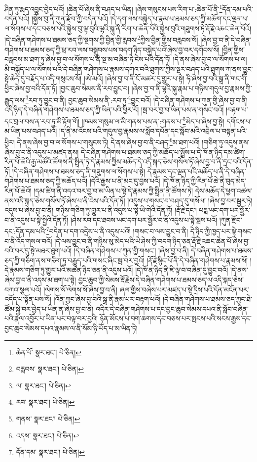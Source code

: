 ཤིན་ཏུ་རྨད་འབྱུང་བྱེད་པའོ། །ཆེན་པོ་ཞེས་ནི་བཤད་པ་ཡིན། །ཞེས་གསུངས་པས་རིག་པ་:ཆེན་པོ་ནི་\footnote{ཆེན་པོ་  སྣར་ཐང་།  པེ་ཅིན། }དོན་དམ་པའི་བདེན་པའོ། །སྐྱེས་བུ་ནི་ཀུན་རྫོབ་ཀྱི་བདེན་པའོ། །དེ་དག་ལས་བསྐྱེད་པ་རྣམ་པ་ཐམས་ཅད་ཀྱི་མཆོག་དང་ལྡན་པ་ལ་སོགས་པ་དང་བཅས་པའི་སྐྱེས་བུ་ལྟ་བུའི་ལྷའི་སྐུ་ནི་རིག་པ་ཆེན་པོའི་སྐྱེས་བུའི་གཟུགས་ཏེ་རྡོ་རྗེ་འཆང་ཆེན་པོའོ། །དེ་བཞིན་གཤེགས་པ་ཐམས་ཅད་ཀྱི་སྔགས་ཀྱི་བྱིན་གྱི་རླབས་\footnote{བརླབས་  སྣར་ཐང་།  པེ་ཅིན། }ཀྱིས་བྱིན་གྱིས་བརླབས་སོ། །ཞེས་བྱ་བ་ནི་དེ་བཞིན་གཤེགས་པ་ཐམས་ཅད་ཀྱི་ཕྲ་རབ་ལས་བསྒྲུབས་པས་བདག་ཉིད་བསྐྱེད་པའོ་ཞེས་བྱ་བར་དགོངས་སོ། །བྱིན་གྱིས་བརླབས་མ་ཐག་ཏུ་ཞེས་བྱ་བ་ལ་སོགས་པ་ནི་སྔ་མ་བཞིན་ཏེ་ངེས་པའི་དོན་ཏོ། །དེ་ནས་ཞེས་བྱ་བ་ལ་སོགས་པ་ལ། མི་བསྐྱོད་པ་ལ་སོགས་པའི་དེ་བཞིན་གཤེགས་པ་རྣམས་དགའ་བའི་ཐུགས་ཀྱིས་སྔར་བཤད་པའི་ཐུགས་ཀ་ནས་བྱུང་སྟེ་ཆེད་དུ་བརྗོད་པ་འདི་གསུངས་སོ། །ཨེ་མའོ། །ཞེས་བྱ་བ་ནི་ངོ་མཚར་དུ་གྱུར་པ་སྟེ། ཧི་ཞེས་བྱ་བའི་སྒྲ་ནི་གང་གི་ཕྱིར་ཞེས་བྱ་བའི་དོན་ཏོ། །བྱང་ཆུབ་སེམས་ནི་རབ་བྱུང་བ། །ཞེས་བྱ་བ་ནི་ལྷའི་སྐུ་རྣམ་པ་གཉིས་གདུལ་བྱ་རྣམས་ཀྱི་རྒྱུད་ལས་\footnote{ལ་  སྣར་ཐང་།  པེ་ཅིན། }རབ་ཏུ་བྱུང་བ་ནི། བྱང་ཆུབ་སེམས་ནི་:རབ་ཏུ་\footnote{རབ་  སྣར་ཐང་།  པེ་ཅིན། }བྱུང་བའོ། །དེ་བཞིན་གཤེགས་པ་ཀུན་གྱི་ཞེས་བྱ་བ་ནི། འདི་ཉིད་དེ་བཞིན་གཤེགས་པ་ཐམས་ཅད་ཀྱི་ཡིན་པའི་ཕྱིར་རོ། །སྦ་བར་བྱ་བ་ཡིན་པས་ན་གསང་བའོ། །བརྟག་པ་དང་བྲལ་བས་ན་རབ་ཏུ་མི་རྟོག་གོ། །ཁམས་གསུམ་ལ་མི་གནས་པས་ན་:གནས་པ་\footnote{གནས་  སྣར་ཐང་།  པེ་ཅིན། }མེད་པ་ཞེས་བྱ་སྟེ། དགོངས་པ་མ་ཡིན་པས་བཤད་པའོ། །ད་ནི་མ་འོངས་པའི་གདུལ་བྱ་རྣམས་ལ་སློབ་དཔོན་དང་སློབ་མའི་འབྲེལ་པ་བསྟན་པའི་ཕྱིར། དེ་ནས་ཞེས་བྱ་བ་ལ་སོགས་པ་གསུངས་ཏེ། དེ་ནས་ཞེས་བྱ་བ་ནི་བཤད་\footnote{འདས་  སྣར་ཐང་།  པེ་ཅིན། }མ་ཐག་པའོ། །གཅིག་ཏུ་འདུས་ནས་ཞེས་བྱ་བ་ནི་འདུས་པ་མཛད་ནས། དེ་བཞིན་གཤེགས་པ་ཐམས་ཅད་ཀྱི་མཆོད་པ་སྤྲོས་པ་དེ་ཁོ་ན་ཉིད་དམ་ཚིག་རིན་པོ་ཆེའི་རྒྱ་མཚོའི་ཚོགས་ནི་སྤྲིན་ཏེ་དེ་རྣམས་ཀྱིས་མཆོད་དེ་འདི་སྐད་ཅེས་གསོལ་ཏོ་ཞེས་བྱ་བ་ནི་དྲང་བའི་དོན་ཏོ། །དེ་བཞིན་གཤེགས་པ་ཐམས་ཅད་ནི་གཟུགས་ལ་སོགས་པ་སྟེ། དེ་རྣམས་དང་ལྡན་པའི་མཆོད་པ་ནི་དེ་བཞིན་གཤེགས་པ་ཐམས་ཅད་ཀྱི་མཆོད་པའོ། །དེའི་རྒྱས་པ་ནི་མང་དུ་བྱས་པའོ། །དེ་ཁོ་ན་ཉིད་ཀྱི་རིན་པོ་ཆེ་ནི་བུད་མེད་རིན་པོ་ཆེའོ། །དམ་ཚིག་ནི་འདའ་བར་བྱ་བ་མ་ཡིན་པ་སྟེ་དེ་རྣམས་ཀྱི་སྤྲིན་ནི་ཚོགས་ཏེ། དེས་མཆོད་དེ་ཕྱག་འཚལ་ནས་འདི་སྐད་ཅེས་གསོལ་ཏོ་ཞེས་པ་ནི་ངེས་པའི་དོན་ཏོ། །འདུས་པ་གསང་བ་བཤད་དུ་གསོལ། །ཞེས་བྱ་བར་སྦྱར་ཏེ། འདུས་པ་ཞེས་བྱ་བ་ནི། གཉིས་གཅིག་ཏུ་གྱུར་པ་ནི་འདུས་པ་སྟེ་ཡི་གེའི་དོན་ཏོ། །རྡོ་རྗེ་དང་། པདྨ་ཡང་དག་པར་སྦྱོར་བ་ནི་འདུས་པ་སྟེ་སྤྱིའི་དོན་ཏོ། །ཤེས་རབ་དང་ཐབས་ཡང་དག་པར་སྦྱོར་བ་ནི་འདུས་པ་སྟེ་སྦས་པའོ། །ཀུན་རྫོབ་དང་:དོན་དམ་པའི་\footnote{དོན་དམ་  སྣར་ཐང་།  པེ་ཅིན། }བདེན་པ་དག་འདྲེས་པ་ནི་འདུས་པའོ། །གསང་བ་ལས་བྱུང་བ་ནི། དེ་ཉིད་ཀྱི་ཁྱད་པར་སྟེ་གསང་བ་ནི་འོད་གསལ་བའོ། །དེ་ལས་བྱུང་བ་ནི་གཉིས་སུ་མེད་པའི་ཡེ་ཤེས་ཀྱི་བདག་ཉིད་ཅན་རྡོ་རྗེ་འཆང་ཆེན་པོ་ཞེས་བྱ་བའི་བར་དུ་སྟེ་མཐར་ཐུག་པའོ། །དེ་བཞིན་གཤེགས་པ་ཀུན་གྱི་གསང་། །ཞེས་བྱ་བ་ནི། དེ་བཞིན་གཤེགས་པ་ཐམས་ཅད་ཀྱི་གཅིག་ནས་གཅིག་ཏུ་བརྒྱུད་པའི་གསང་ཞིང་སྦ་བར་བྱའོ། །རྡོ་རྗེ་སྙིང་པོ་ནི་དེ་བཞིན་གཤེགས་པ་རྣམས་སོ། །དེ་རྣམས་གཅིག་ཏུ་གྱུར་པའི་མཚན་ཉིད་ཅན་ནི་འདུས་པའོ། །དེ་ཁོ་ན་ཉིད་ནི་ཇི་ལྟ་བ་བཞིན་དུ་བྱུང་བའོ། །དེ་ནས་ཞེས་བྱ་བ་ནི་འདས་མ་ཐག་པ་སྟེ། བྱང་ཆུབ་ཀྱི་སེམས་རྡོ་རྗེས་དེ་བཞིན་གཤེགས་པ་ཐམས་ཅད་ལ་འདི་སྐད་ཅེས་བཀའ་སྩལ་པའོ། །ལེགས་སོ་ལེགས་སོ་ཞེས་བྱ་བ་ནི། ཞལ་གྱིས་བཞེས་པར་མཛད་པ་སྟེ་དྲིས་པའི་དོན་མངོན་པར་འདོད་པ་སྟོན་པས་སོ། །འོན་ཀྱང་ཞེས་བྱ་བའི་སྒྲ་ནི་རྣམ་པར་བརྟག་པའོ། །དེ་བཞིན་གཤེགས་པ་ཐམས་ཅད་ཀྱང་ཐེ་ཚོམ་སྐྱེ་བར་བྱེད་པ་ཡིན་ན་ཞེས་བྱ་བ་ནི། འདིར་དེ་བཞིན་གཤེགས་པ་དང་བྱང་ཆུབ་སེམས་དཔའ་ནི་སློབ་བཞིན་པའི་རྣལ་འབྱོར་པ་ཡིན་པར་བལྟ་བར་བྱའི། ཉོན་མོངས་པ་བག་ཆགས་དང་བཅས་པར་སྤངས་པའི་སངས་རྒྱས་དང་བྱང་ཆུབ་སེམས་དཔའ་རྣམས་ལ་ནི་སོམ་ཉི་ཡོད་པ་མ་ཡིན་ཏེ། 